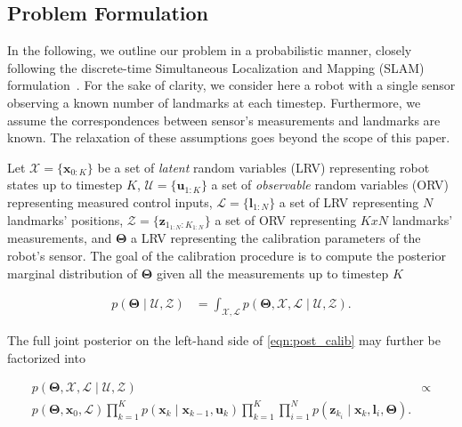 \subsection{Problem Formulation\label{subsec:prob}}

In the following, we outline our problem in a probabilistic manner, closely
following the discrete-time Simultaneous Localization and Mapping (SLAM)
formulation~\cite{durrantwhyte06simultaneous}. For the sake of clarity, we
consider here a robot with a single sensor observing a known number of landmarks
at each timestep. Furthermore, we assume the correspondences between sensor's
measurements and landmarks are known. The relaxation of these assumptions goes
beyond the scope of this paper.

Let
$\mathcal{X}=\{\mathbf{x}_{0:K}\}$ be a set of \emph{latent} random variables
(LRV) representing robot states up to timestep $K$,
$\mathcal{U}=\{\mathbf{u}_{1:K}\}$ a set of \emph{observable} random variables
(ORV) representing measured control inputs, $\mathcal{L}=\{\mathbf{l}_{1:N}\}$ a
set of LRV representing $N$ landmarks' positions,
$\mathcal{Z}=\{\mathbf{z}_{1_{1:N}:K_{1:N}}\}$ a set of ORV representing $KxN$
landmarks' measurements, and $\boldsymbol{\Theta}$ a LRV representing the
calibration parameters of the robot's sensor. The goal of the calibration
procedure is to compute the posterior marginal distribution of
$\boldsymbol{\Theta}$ given all the measurements up to timestep $K$

\begin{equation}\label{eqn:post_calib}
  \begin{aligned}
  p(\boldsymbol{\Theta}\mid\mathcal{U},\mathcal{Z}) &=
    \int_{\mathcal{X}, \mathcal{L}}p(\boldsymbol{\Theta}, \mathcal{X},
    \mathcal{L} \mid\mathcal{U},\mathcal{Z}).
  \end{aligned}
\end{equation}

The full joint posterior on the left-hand side of \eqref{eqn:post_calib} may
further be factorized into

\begin{equation}\label{eqn:post_joint_factorized}
  \begin{aligned}
  p(\boldsymbol{\Theta}, \mathcal{X},
    \mathcal{L} \mid\mathcal{U},\mathcal{Z}) &\propto\\
    p(\boldsymbol{\Theta}, \mathbf{x}_0,\mathcal{L})
    \prod_{k=1}^K p(\mathbf{x}_k\mid\mathbf{x}_{k - 1},\mathbf{u}_k)
    \prod_{k=1}^K\prod_{i=1}^N p(\mathbf{z}_{k_i}\mid\mathbf{x}_k,
    \mathbf{l}_i,\boldsymbol{\Theta}).
  \end{aligned}
\end{equation}

